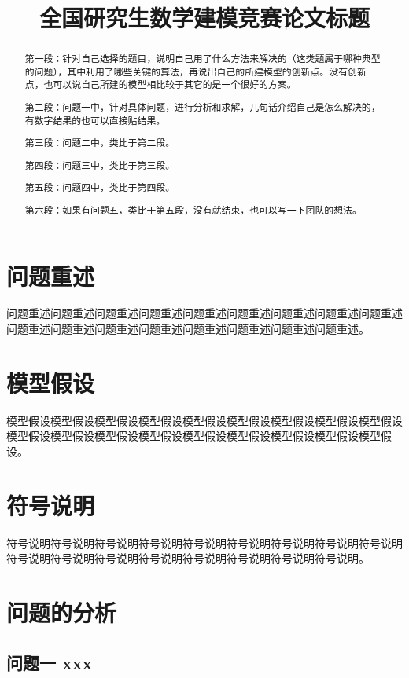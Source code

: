 \documentclass[bwprint]{gmcmthesis}
\title{全国研究生数学建模竞赛论文标题}
\begin{document}
 \maketitle
 \begin{abstract}
第一段：针对自己选择的题目，说明自己用了什么方法来解决的（这类题属于哪种典型的问题），其中利用了哪些关键的算法，再说出自己的所建模型的创新点。没有创新点，也可以说自己所建的模型相比较于其它的是一个很好的方案。

第二段：问题一中，针对具体问题，进行分析和求解，几句话介绍自己是怎么解决的，有数字结果的也可以直接贴结果。

第三段：问题二中，类比于第二段。

第四段：问题三中，类比于第三段。

第五段：问题四中，类比于第四段。

第六段：如果有问题五，类比于第五段，没有就结束，也可以写一下团队的想法。






\end{abstract}


\tableofcontents

\section{问题重述}
问题重述问题重述问题重述问题重述问题重述问题重述问题重述问题重述问题重述问题重述问题重述问题重述问题重述问题重述问题重述问题重述问题重述。
\section{模型假设}
模型假设模型假设模型假设模型假设模型假设模型假设模型假设模型假设模型假设模型假设模型假设模型假设模型假设模型假设模型假设模型假设模型假设模型假设。
\section{符号说明}
符号说明符号说明符号说明符号说明符号说明符号说明符号说明符号说明符号说明符号说明符号说明符号说明符号说明符号说明符号说明符号说明符号说明。
\section{问题的分析}
\subsection{问题一 xxx}
\end{document}

